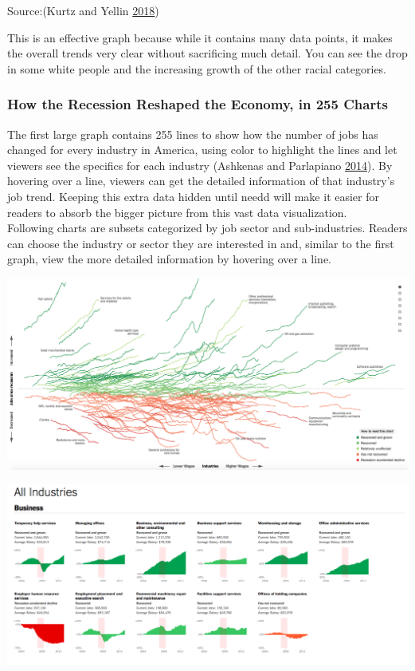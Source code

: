 \documentclass[]{book}
\begin{document}
Source:(Kurtz and Yellin \protect\hyperlink{ref-age_groups}{2018})

This is an effective graph because while it contains many data points, it makes the overall trends very clear without sacrificing much detail. You can see the drop in some white people and the increasing growth of the other racial categories.

\hypertarget{how-the-recession-reshaped-the-economy-in-255-charts}{%
\subsubsection{How the Recession Reshaped the Economy, in 255 Charts}\label{how-the-recession-reshaped-the-economy-in-255-charts}}

The first large graph contains 255 lines to show how the number of jobs has changed for every industry in America, using color to highlight the lines and let viewers see the specifics for each industry (Ashkenas and Parlapiano \protect\hyperlink{ref-recession_economy}{2014}). By hovering over a line, viewers can get the detailed information of that industry's job trend. Keeping this extra data hidden until needd will make it easier for readers to absorb the bigger picture from this vast data visualization.\\
Following charts are subsets categorized by job sector and sub-industries. Readers can choose the industry or sector they are interested in and, similar to the first graph, view the more detailed information by hovering over a line.

\includegraphics{images/recession_jobs.png}

\includegraphics{images/recession_jobs2.png}
\end{document}
